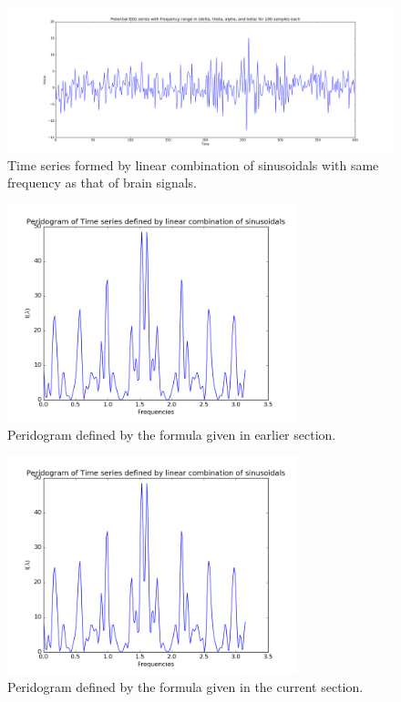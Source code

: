 \documentclass{article}
\begin{document}
\begin{figure}[ht!]
  \centering
  \includegraphics[width=1\textwidth]{images/changepoint_sd/ts}
  \caption{Time series formed by linear combination of sinusoidals with same frequency as that of brain signals.\label{fig:cp_sd_ts}}
\end{figure}

\begin{figure}[ht!]
  \centering
  \includegraphics[width=0.75\textwidth]{images/changepoint_sd/peri1}
  \caption{Peridogram defined by the formula given in earlier section.\label{fig:cp_sd_ts}}
\end{figure}

\begin{figure}[ht!]
  \centering
  \includegraphics[width=0.75\textwidth]{images/changepoint_sd/peri1}
  \caption{Peridogram defined by the formula given in the current section.\label{fig:cp_sd_ts}}
\end{figure}



\end{document}

